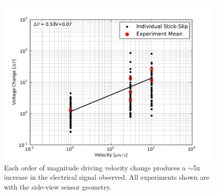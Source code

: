 \begin{figure}
\includegraphics[width=30pc]{chap_electrical/vchange_velocity.pdf}
\caption{Each order of magnitude driving velocity change produces a $\sim$5x increase in the electrical signal observed.  All experiments shown are with the side-view sensor geometry.}
\label{voltage_velocity}
\end{figure}

